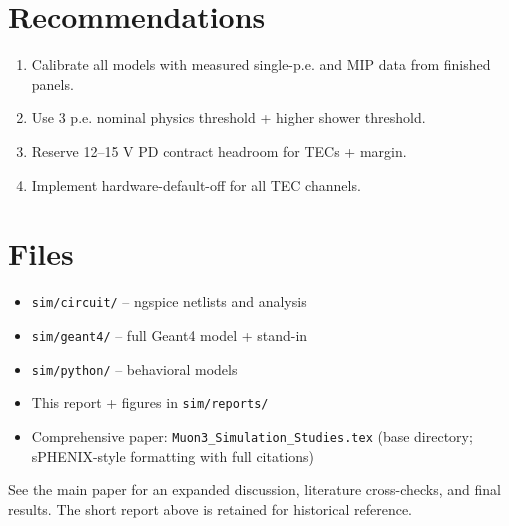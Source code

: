 \documentclass[11pt,a4paper]{article}
\begin{document}
\section{Recommendations}
\begin{enumerate}
\item Calibrate all models with measured single-p.e. and MIP data from finished panels.
\item Use 3 p.e. nominal physics threshold + higher shower threshold.
\item Reserve 12--15 V PD contract headroom for TECs + margin.
\item Implement hardware-default-off for all TEC channels.
\end{enumerate}

\section{Files}
\begin{itemize}
\item \texttt{sim/circuit/} -- ngspice netlists and analysis
\item \texttt{sim/geant4/} -- full Geant4 model + stand-in
\item \texttt{sim/python/} -- behavioral models
\item This report + figures in \texttt{sim/reports/}
\item Comprehensive paper: \texttt{Muon3\_Simulation\_Studies.tex} (base directory; sPHENIX-style formatting with full citations)
\end{itemize}

See the main paper for an expanded discussion, literature cross-checks, and final results. The short report above is retained for historical reference.
\end{document}
